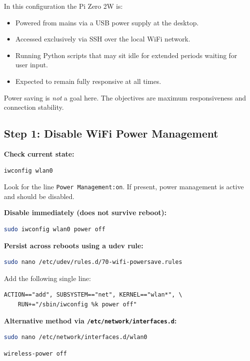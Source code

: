 \documentclass[11pt,letter]{article}
\begin{document}
In this configuration the Pi Zero 2W is:
\begin{itemize}
  \item Powered from mains via a USB power supply at the desktop.
  \item Accessed exclusively via SSH over the local WiFi network.
  \item Running Python scripts that may sit idle for extended periods waiting for user input.
  \item Expected to remain fully responsive at all times.
\end{itemize}

Power saving is \emph{not} a goal here. The objectives are maximum responsiveness and connection stability.

\subsection{Step 1: Disable WiFi Power Management}

\textbf{Check current state:}
\begin{lstlisting}[language=bash, caption={Check WiFi power management state}]
iwconfig wlan0
\end{lstlisting}

Look for the line \texttt{Power Management:on}. If present, power management is active and should be disabled.

\textbf{Disable immediately (does not survive reboot):}
\begin{lstlisting}[language=bash, caption={Disable WiFi power management immediately}]
sudo iwconfig wlan0 power off
\end{lstlisting}

\textbf{Persist across reboots using a udev rule:}
\begin{lstlisting}[language=bash, caption={Create a persistent udev rule}]
sudo nano /etc/udev/rules.d/70-wifi-powersave.rules
\end{lstlisting}

Add the following single line:
\begin{lstlisting}[caption={Contents of 70-wifi-powersave.rules}]
ACTION=="add", SUBSYSTEM=="net", KERNEL=="wlan*", \
    RUN+="/sbin/iwconfig %k power off"
\end{lstlisting}

\textbf{Alternative method via \texttt{/etc/network/interfaces.d}:}
\begin{lstlisting}[language=bash, caption={Create interface configuration file}]
sudo nano /etc/network/interfaces.d/wlan0
\end{lstlisting}
\begin{lstlisting}[caption={Contents of wlan0 interface config}]
wireless-power off
\end{lstlisting}
\end{document}
